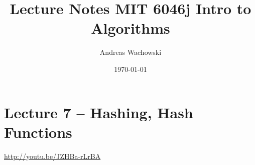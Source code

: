 \documentclass[12pt]{article}
\title{Lecture Notes MIT 6046j Intro to Algorithms}
\author{Andreas Wachowski}
\date{\today}
\newcommand{\lectureurl}[1]{\def\lectureurlprefix{#1}\url{#1}}
\begin{document}
\maketitle
\section{Lecture 7 -- Hashing, Hash Functions}
\lectureurl{http://youtu.be/JZHBa-rLrBA}
\end{document}
